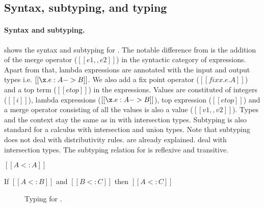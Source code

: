 
\subsection{Syntax, subtyping, and typing}

\paragraph*{Syntax and subtyping.}
 shows the syntax and subtyping for \namems.
The notable difference from \name is the addition of the merge 
operator ($[[e1,,e2]]$) 
in the syntactic category of expressions.
Apart from that, lambda expressions are annotated with the input and
output types i.e. $[[\x.e:A->B]]$.
We also add a fix point operator ($[[fix x . e . A]]$) and a top
term ($[[etop]]$) in the expressions.
Values are constituted of integers ($[[i]]$), 
lambda expressions ($[[\x.e:A->B]]$), 
top expression ($[[etop]]$) and a merge operator consisting of all the values 
is also a value ($[[v1,,v2]]$).
Types and the context stay the same as in \name with intersection types.
Subtyping is also standard for a calculus with intersection and union types.
Note that subtyping does not deal with distributivity rules.
 are already explained.
 deal with intersection types.
The subtyping relation for \namems is reflexive and transitive.

\begin{lemma}
  $[[A <: A]]$
\label{lemma:merge:sub:refl}
\end{lemma}

\begin{lemma}
  If $[[A <: B]]$ and $[[B <: C]]$ then $[[A <: C]]$
\label{lemma:merge:sub:trans}
\end{lemma}


\begin{figure}[t]
  \begin{small}
    \centering
  \end{small}
  \caption{Typing for \namems.}
  \label{fig:merge:typing}
\end{figure}

